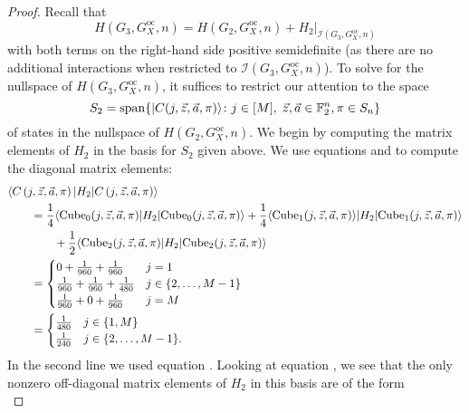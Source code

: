 \documentclass[../thesis-main/thesis-main]{subfiles}
\begin{document}
\begin{proof}
Recall that
\begin{equation}
H(G_{3},G_X^{\text{oc}},n)=H(G_{2},G_X^{\text{oc}},n)+H_{2}|_{\mathcal{I}(G_{3},G_X^{\text{oc}},n)}
\end{equation}
with both terms on the right-hand side positive semidefinite (as there are no additional interactions when restricted to $\mathcal{I}(G_3,G_X^\text{oc},n)$). To solve for the nullspace of $H(G_{3},G_X^{\text{oc}},n)$, it suffices to restrict our attention to the space
\begin{equation}
  S_{2}=\operatorname{span}\{ |C(j,\vec{z},\vec{a},\pi)\rangle\colon
    j\in[M],\;\vec{z},\vec{a}\in\mathbb{F}_2^{n}, \pi \in S_n\}
  \label{eq:S_beta_basis}
\end{equation}
of states in the nullspace of $H(G_{2},G_X^{\text{oc}},n)$. We begin by computing the matrix elements of $H_{2}$ in the basis for $S_{2}$ given above. We use equations  and  to compute the diagonal matrix elements: 
\begin{align}
&\langle C\left(j,\vec{z},\vec{a},\pi\right)|H_{2}|C\left(j,\vec{z},\vec{a},\pi\right)\rangle\nonumber\\
&\qquad=  \frac{1}{4}\langle{\operatorname{Cube}_{0}(j,\vec{z},\vec{a},\pi)}|H_{2}|{\operatorname{Cube}_{0}(j,\vec{z},\vec{a},\pi)}\rangle+\frac{1}{4}\langle{\operatorname{Cube}_{1}(j,\vec{z},\vec{a},\pi)}\rangle|H_{2}|{\operatorname{Cube}_{1}(j,\vec{z},\vec{a},\pi)}\rangle\nonumber\\
 & \qquad \qquad +\frac{1}{2}\langle{\operatorname{Cube}_{2}(j,\vec{z},\vec{a},\pi)}|H_{2}|{\operatorname{Cube}_{2}(j,\vec{z},\vec{a},\pi)}\rangle\\
&\qquad =  \begin{cases}
0+\frac{1}{960}+\frac{1}{960} & j=1\\
\frac{1}{960}+\frac{1}{960}+\frac{1}{480} & j\in\{2,\ldots,M-1\}\\
\frac{1}{960}+0+\frac{1}{960} & j=M
\end{cases}\\
&\qquad =  \begin{cases}
\frac{1}{480} & j\in\{1,M\} \\
\frac{1}{240} & j\in\{2,\ldots,M-1\}.
\end{cases}\label{eq:diag_C_mat_els}
\end{align}
In the second line we used equation . Looking at equation , we see that the only nonzero off-diagonal matrix elements of $H_{2}$ in this basis are of the form 
\begin{equation}

\end{equation}
\end{proof}
\end{document}
